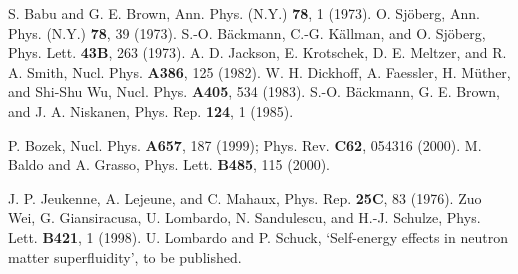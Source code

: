 \documentclass[runningheads]{svmult}
\begin{document}
\begin{thebibliography}{}
 S. Babu and G. E. Brown,
 Ann. Phys. (N.Y.) {\bf 78}, 1 (1973).
 O. Sj\"oberg,
 Ann. Phys. (N.Y.) {\bf 78}, 39 (1973).
 S.-O. B\"ackmann, C.-G. K\"allman, and O. Sj\"oberg,
 Phys. Lett. {\bf 43B}, 263 (1973).
 A. D. Jackson, E. Krotschek, D. E. Meltzer, and R. A. Smith,
 Nucl. Phys. {\bf A386}, 125 (1982).
 W. H. Dickhoff, A. Faessler, H. M\"uther, and Shi-Shu Wu,
 Nucl. Phys. {\bf A405}, 534 (1983).
 S.-O. B\"ackmann, G. E. Brown, and J. A. Niskanen,
 Phys. Rep. {\bf 124}, 1 (1985).

 P. Bozek,
 Nucl. Phys. {\bf A657}, 187 (1999); Phys. Rev. {\bf C62}, 054316 (2000).
 M. Baldo and A. Grasso,
 Phys. Lett. {\bf B485}, 115 (2000). 

 J. P. Jeukenne, A. Lejeune, and C. Mahaux, 
 Phys. Rep. {\bf 25C}, 83 (1976).               
 Zuo Wei, G. Giansiracusa, U. Lombardo, N. Sandulescu, and H.-J. Schulze,
 Phys. Lett. {\bf B421}, 1 (1998).
 U. Lombardo and P. Schuck, 
 `Self-energy effects in neutron matter superfluidity', 
 to be published.

\end{thebibliography}

%
\end{document}
